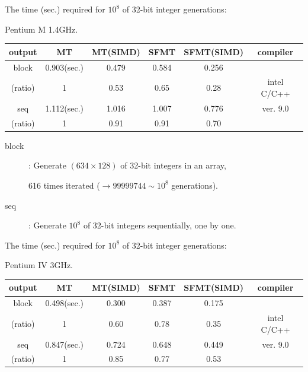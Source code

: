 \documentclass[a4j,12pt,landscape]{jarticle}
\begin{document}
\newpage
\begin{center}
The time (sec.) required for $10^8$ 
of 32-bit integer generations:

Pentium M 1.4GHz. 

\vskip 2mm
\begin{tabular}{|c||c|c|c|c|c|}
\hline
output & MT & MT{\Large(SIMD)} & SFMT & SFMT{\Large (SIMD)} & compiler
 \\ \hline \hline
 block   & 0.903(sec.) & 0.479 & 0.584 & 0.256 &    \\ \cline{2-5}
 (ratio) & 1     & 0.53\phantom{0}  & 0.65\phantom{0}  & 0.28\phantom{0}  & intel C/C++ \\ \cline{1-5}
 seq     & 1.112(sec.) & 1.016 & 1.007 & 0.776 & ver. 9.0\\ \cline{2-5}
 (ratio) & 1     & 0.91\phantom{0}  & 0.91\phantom{0}  & 0.70\phantom{0}  &  \\ \hline
\end{tabular}
\end{center}
\begin{description}
\item[block]: Generate $(634 \times 128)$ of 32-bit integers 
in an array, 

616 times iterated ($\to 99999744\sim 10^8$ generations).
\item[seq]: Generate $10^8$ of 32-bit integers sequentially,
one by one.
\end{description}
\newpage
\begin{center}
The time (sec.) required for $10^8$ 
of 32-bit integer generations:

Pentium IV 3GHz. 

\vskip 2mm
\begin{tabular}{|c||c|c|c|c|c|}
\hline
output & MT & MT{\Large(SIMD)} & SFMT & SFMT{\Large (SIMD)} & compiler
\\ \hline \hline
 block & 0.498(sec.) & 0.300 & 0.387 & 0.175 & \\ \cline{2-5}
(ratio)& 1     & 0.60\phantom{0}  & 0.78\phantom{0}  & 0.35\phantom{0}  & intel C/C++\\ \cline{1-5}
 seq   & 0.847(sec.) & 0.724 & 0.648 & 0.449 & ver. 9.0 \\\cline{2-5}
(ratio)& 1     & 0.85\phantom{0}  & 0.77\phantom{0}  & 0.53\phantom{0}  &  \\ \hline
\end{tabular}
\end{center}
\end{document}
